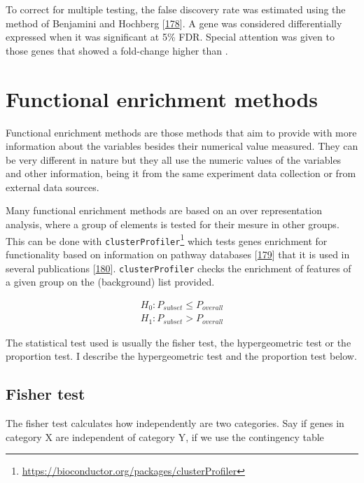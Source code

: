 \documentclass[
  a4paper,
]{book}
\DeclareRobustCommand{\href}[2]{#2\footnote{\url{#1}}}
\begin{document}
To correct for multiple testing, the false discovery rate was estimated using the method of Benjamini and Hochberg {[}\protect\hyperlink{ref-yoavbenjamini}{178}{]}.
A gene was considered differentially expressed when it was significant at 5\% FDR.
Special attention was given to those genes that showed a fold-change higher than \textbar.

\hypertarget{functional-enrichment-methods}{%
\section{Functional enrichment methods}\label{functional-enrichment-methods}}

Functional enrichment methods are those methods that aim to provide with more information about the variables besides their numerical value measured.
They can be very different in nature but they all use the numeric values of the variables and other information, being it from the same experiment data collection or from external data sources.

Many functional enrichment methods are based on an over representation analysis, where a group of elements is tested for their mesure in other groups.
This can be done with \href{https://bioconductor.org/packages/clusterProfiler}{\texttt{clusterProfiler}} which tests genes enrichment for functionality based on information on pathway databases {[}\protect\hyperlink{ref-wu2021}{179}{]} that it is used in several publications {[}\protect\hyperlink{ref-richter2021}{180}{]}.
\texttt{clusterProfiler} checks the enrichment of features of a given group on the (background) list provided.

\[
\begin{aligned}
H_0 : P_{subset} \leq  P_{overall} \\
H_1 : P_{subset} > P_{overall}
\end{aligned}
\]

The statistical test used is usually the fisher test, the hypergeometric test or the proportion test.
I describe the hypergeometric test and the proportion test below.

\hypertarget{fisher-test}{%
\subsection{Fisher test}\label{fisher-test}}

The fisher test calculates how independently are two categories.
Say if genes in category X are independent of category Y, if we use the contingency table
\end{document}
